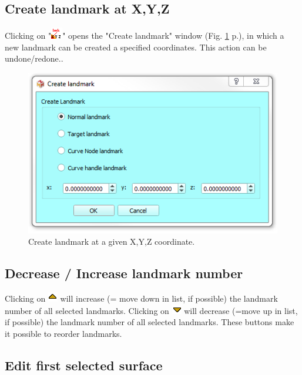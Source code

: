 \subsection{Create landmark at X,Y,Z}
Clicking on "\includegraphics[scale=0.7]{images/06/objects/landmark_xyz.png}" opens the "Create landmark" window  (Fig. \ref{create_landmark} p.\pageref{create_landmark}), in which a new landmark can be created a specified coordinates. This action can be undone/redone..

\begin{figure}
  \centering
  \includegraphics[scale=0.55]{images/06/objects/create_landmark.png} 
	\caption{Create landmark at a given X,Y,Z coordinate.}
\label{create_landmark}
 
\end{figure}
\subsection{Decrease / Increase landmark number}
Clicking on \includegraphics[scale=0.7]{images/06/objects/move_up.png} will increase (= move down in list, if possible) the landmark number of all selected landmarks. Clicking on \includegraphics[scale=0.7]{images/06/objects/move_down.png} will decrease (=move up in list, if possible) the landmark number of all selected landmarks. These buttons make it possible to reorder landmarks.


\subsection{Edit first selected surface}

